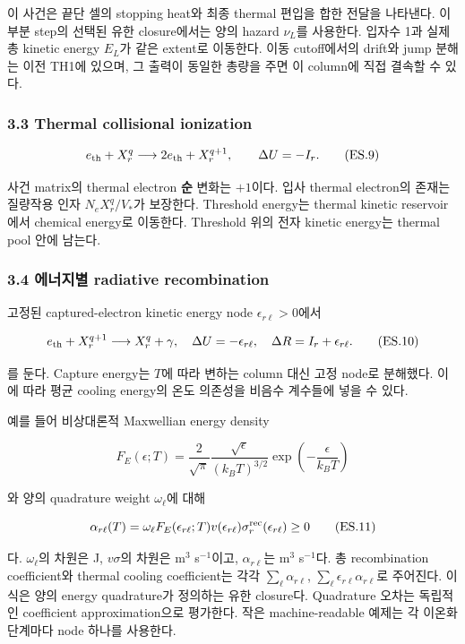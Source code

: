 이 사건은 끝단 셀의 stopping heat와 최종 thermal 편입을 합한 전달을 나타낸다. 이 부분 step의 선택된 유한 closure에서는 양의 hazard \(\nu_L\)를 사용한다. 입자수 1과 실제 총 kinetic energy \(E_L\)가 같은 extent로 이동한다. 이동 cutoff에서의 drift와 jump 분해는 이전 TH1에 있으며, 그 출력이 동일한 총량을 주면 이 column에 직접 결속할 수 있다.

\hypertarget{thermal-collisional-ionization}{%
\subsubsection{3.3 Thermal collisional ionization}\label{thermal-collisional-ionization}}

\[
e_{\rm th}+X_r^q
\longrightarrow2e_{\rm th}+X_r^{q+1},
\qquad \Delta U=-I_r.
\tag{ES.9}
\]

사건 matrix의 thermal electron \textbf{순} 변화는 \(+1\)이다. 입사 thermal electron의 존재는 질량작용 인자 \(N_eX_r^q/V_*\)가 보장한다. Threshold energy는 thermal kinetic reservoir에서 chemical energy로 이동한다. Threshold 위의 전자 kinetic energy는 thermal pool 안에 남는다.

\hypertarget{uxc5d0uxb108uxc9c0uxbcc4-radiative-recombination}{%
\subsubsection{3.4 에너지별 radiative recombination}\label{uxc5d0uxb108uxc9c0uxbcc4-radiative-recombination}}

고정된 captured-electron kinetic energy node \(\epsilon_{r\ell}>0\)에서

\[
e_{\rm th}+X_r^{q+1}
\longrightarrow X_r^q+\gamma,
\quad
\Delta U=-\epsilon_{r\ell},
\quad
\Delta R=I_r+\epsilon_{r\ell}.
\tag{ES.10}
\]

를 둔다. Capture energy는 \(T\)에 따라 변하는 column 대신 고정 node로 분해했다. 이에 따라 평균 cooling energy의 온도 의존성을 비음수 계수들에 넣을 수 있다.

예를 들어 비상대론적 Maxwellian energy density

\[
F_E(\epsilon;T)=
\frac{2}{\sqrt\pi}
\frac{\sqrt{\epsilon}}{(k_BT)^{3/2}}
\exp\!\left(-\frac{\epsilon}{k_BT}\right)
\]

와 양의 quadrature weight \(\omega_\ell\)에 대해

\[
\alpha_{r\ell}(T)=
\omega_\ell F_E(\epsilon_{r\ell};T)
v(\epsilon_{r\ell})\sigma_r^{\rm rec}(\epsilon_{r\ell})
\ge0
\tag{ES.11}
\]

다. \(\omega_\ell\)의 차원은 J, \(v\sigma\)의 차원은 m\(^3\) s\(^{-1}\)이고, \(\alpha_{r\ell}\)는 m\(^3\) s\(^{-1}\)다. 총 recombination coefficient와 thermal cooling coefficient는 각각 \(\sum_\ell\alpha_{r\ell}\), \(\sum_\ell\epsilon_{r\ell}\alpha_{r\ell}\)로 주어진다. 이 식은 양의 energy quadrature가 정의하는 유한 closure다. Quadrature 오차는 독립적인 coefficient approximation으로 평가한다. 작은 machine-readable 예제는 각 이온화 단계마다 node 하나를 사용한다.

